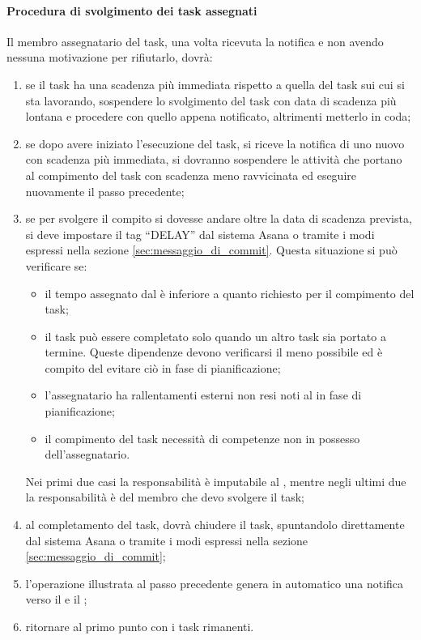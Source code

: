 			\paragraph{Procedura di svolgimento dei task assegnati}
			Il membro assegnatario del task, una volta ricevuta la notifica e non avendo nessuna motivazione per rifiutarlo, dovrà:
				\begin{enumerate}
					\item se il task ha una scadenza più immediata rispetto a quella del task sui cui si sta lavorando, sospendere lo svolgimento del task con data di scadenza più lontana e procedere con quello appena notificato, altrimenti metterlo in coda;
					\item se dopo avere iniziato l'esecuzione del task, si riceve la notifica di uno nuovo con scadenza più immediata, si dovranno sospendere le attività che portano al compimento del task con scadenza meno ravvicinata ed eseguire nuovamente il passo precedente;
					\item se per svolgere il compito si dovesse andare oltre la data di scadenza prevista, si deve impostare il tag ``DELAY'' dal sistema Asana o tramite i modi espressi nella sezione \ref{sec:messaggio_di_commit}. \newline
					Questa situazione si può verificare se:
					 	\begin{itemize}
							\item il tempo assegnato dal \roleProjectManager{} è inferiore a quanto richiesto per il compimento del task;
							\item il task può essere completato solo quando un altro task sia portato a termine. Queste dipendenze devono verificarsi il meno possibile ed è compito del \roleProjectManager{} evitare ciò in fase di pianificazione;
					 		\item l'assegnatario ha rallentamenti esterni non resi noti al \roleProjectManager{} in fase di pianificazione;
							\item il compimento del task necessità di competenze non in possesso dell'assegnatario.
					 	\end{itemize}
					\noindent
					Nei primi due casi la responsabilità è imputabile al \roleProjectManager, mentre negli ultimi due la responsabilità è del membro che devo svolgere il task;
					\item al completamento del task, dovrà chiudere il task, spuntandolo direttamente dal sistema Asana o tramite i modi espressi nella sezione \ref{sec:messaggio_di_commit};
					\item l'operazione illustrata al passo precedente genera in automatico una notifica verso il \roleVerifier{} e il \roleProjectManager;
					\item ritornare al primo punto con i task rimanenti. 

				\end{enumerate}
				
